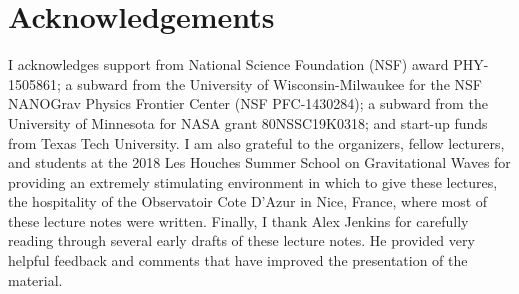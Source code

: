 \section*{Acknowledgements}
\label{s:acknowledgements}

I acknowledges support from National Science Foundation (NSF)
award PHY-1505861; a subward from the University of Wisconsin-Milwaukee
for the NSF NANOGrav Physics Frontier Center (NSF PFC-1430284); 
a subward from the University of Minnesota for NASA grant 80NSSC19K0318; 
and start-up funds from Texas Tech University.
I am also grateful to the organizers, fellow lecturers, and students 
at the 2018 Les Houches Summer School on Gravitational 
Waves for providing an extremely stimulating environment in which to 
give these lectures, the hospitality of the Observatoir Cote
D'Azur in Nice, France, where most of these lecture notes were written.
Finally, I thank Alex Jenkins for carefully reading through several
early drafts of these lecture notes.
He provided very helpful feedback and comments that have improved 
the presentation of the material.
 
